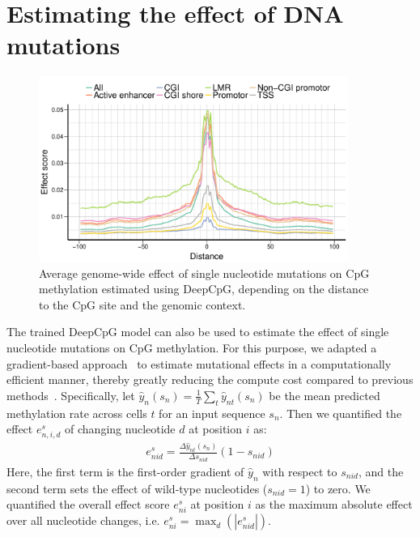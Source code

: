 \section{Estimating the effect of DNA mutations}

\begin{figure}[htbp!]
\centering
\includegraphics[width=0.9\textwidth]{mut_global}
\caption[Average genome-wide effect of single nucleotide mutations on CpG methylation estimated using DeepCpG.]{Average genome-wide effect of single nucleotide mutations on CpG methylation estimated using DeepCpG, depending on the distance to the CpG site and the genomic context.}
\label{fig:dcpg_mut_global}
\end{figure}

The trained DeepCpG model can also be used to estimate the effect of single nucleotide mutations on CpG methylation. For this purpose, we adapted a gradient-based approach~\citep{simonyan_deep_2013} to estimate mutational effects in a computationally efficient manner, thereby greatly reducing the compute cost compared to previous methods~\citep{alipanahi_predicting_2015,zhou_predicting_2015,zhou_predicting_2015}. Specifically, let $\hat{y}_n(s_n)=\frac{1}{T}\sum_t \hat{y}_{nt}(s_n)$ be the mean predicted methylation rate across cells $t$ for an input sequence $s_n$. Then we quantified the effect $e^s_{n,i,d}$ of changing nucleotide $d$ at position $i$ as:
\begin{align}
  e^s_{nid}=\frac{\Delta \hat{y}_{nt}(s_n)}{\Delta s_{nid}}(1-s_{nid})
\end{align}
Here, the first term is the first-order gradient of $\hat{y}_n$ with respect to $s_{nid}$, and the second term sets the effect of wild-type nucleotides ($s_{nid}=1$) to zero. We quantified the overall effect score $e^s_{ni}$ at position $i$ as the maximum absolute effect over all nucleotide changes, i.e. $e^s_{ni}=\max_d(|e^s_{nid}|)$.

